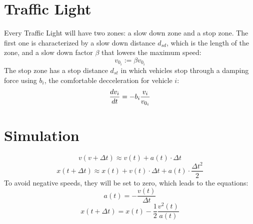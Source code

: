 \documentclass{article}
\begin{document}
\section{Traffic Light}
Every Traffic Light will have two zones: a slow down zone and a stop zone. The first one is characterized by a slow down distance $d_{sd}$, which is the length of the zone, and a slow down factor $\beta$ that lowers the maximum speed:
\begin{equation}
    v_{0_i}:=\beta v_{0_i}
    \label{slow-down}
\end{equation}
The stop zone has a stop distance $d_{st}$ in which vehicles stop through a damping force using $b_i$, the comfortable decceleration for vehicle $i$:
\begin{equation}
    \frac{dv_i}{dt}=-b_i\frac{v_i}{v_{0_i}}
\end{equation}
\section{Simulation}
\begin{equation}
    v(v+\Delta t)\approx v(t)+a(t)\cdot\Delta t
\end{equation}
\begin{equation}
    x(t+\Delta t)\approx x(t)+v(t)\cdot\Delta t+a(t)\cdot\frac{\Delta t^2}{2}
\end{equation}
To avoid negative speeds, they will be set to zero, which leads to the equations:
\begin{equation}
    a(t)=-\frac{v(t)}{\Delta t}
\end{equation}
\begin{equation}
    x(t+\Delta t)=x(t)-\frac{1}{2}\frac{v^2(t)}{a(t)}
\end{equation}
\end{document}
